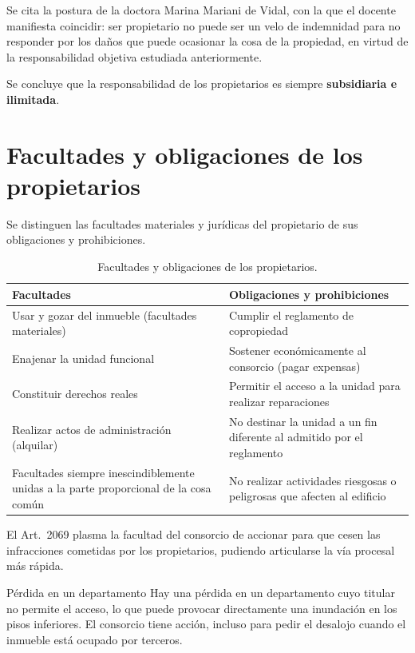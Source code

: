 \documentclass[12pt,oneside]{book}
\begin{document}
Se cita la postura de la doctora Marina Mariani de Vidal, con la que el docente manifiesta coincidir: ser propietario no puede ser un velo de indemnidad para no responder por los daños que puede ocasionar la cosa de la propiedad, en virtud de la responsabilidad objetiva estudiada anteriormente.

Se concluye que la responsabilidad de los propietarios es siempre \textbf{subsidiaria e ilimitada}.

\section{Facultades y obligaciones de los propietarios}

Se distinguen las facultades materiales y jurídicas del propietario de sus obligaciones y prohibiciones.

\begin{table}[H]
\centering
\begin{tabularx}{\textwidth}{
    >{\raggedright\arraybackslash}X
    >{\raggedright\arraybackslash}X
}
\toprule
\textbf{Facultades} & \textbf{Obligaciones y prohibiciones} \\
\midrule
Usar y gozar del inmueble (facultades materiales) & Cumplir el reglamento de copropiedad \\
Enajenar la unidad funcional & Sostener económicamente al consorcio (pagar expensas) \\
Constituir derechos reales & Permitir el acceso a la unidad para realizar reparaciones \\
Realizar actos de administración (alquilar) & No destinar la unidad a un fin diferente al admitido por el reglamento \\
Facultades siempre inescindiblemente unidas a la parte proporcional de la cosa común & No realizar actividades riesgosas o peligrosas que afecten al edificio \\
\bottomrule
\end{tabularx}
\caption{Facultades y obligaciones de los propietarios.}
\end{table}

El Art.~2069 plasma la facultad del consorcio de accionar para que cesen las infracciones cometidas por los propietarios, pudiendo articularse la vía procesal más rápida.

\begin{example}{Pérdida en un departamento}
Hay una pérdida en un departamento cuyo titular no permite el acceso, lo que puede provocar directamente una inundación en los pisos inferiores. El consorcio tiene acción, incluso para pedir el desalojo cuando el inmueble está ocupado por terceros.
\end{example}
\end{document}
